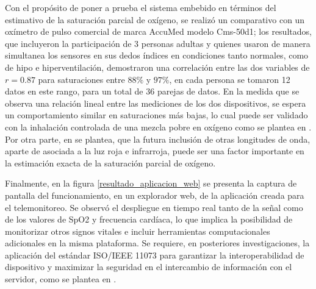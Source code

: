 \documentclass[journal]{IEEEtran}
\begin{document}
Con el propósito de poner a prueba el sistema embebido en términos del estimativo de la saturación parcial de oxígeno, se realizó un comparativo con un oxímetro de pulso comercial de marca AccuMed modelo Cms-50d1; {\color{green}los resultados, que incluyeron la participación de 3 personas adultas y quienes usaron de manera simultanea los sensores en sus dedos índices en condiciones tanto normales, como de hipo e hiperventilación, 
demostraron una correlación entre las dos variables de $r=0.87$ para saturaciones entre $88\%$ y $97\%$,
en cada persona se tomaron 12 datos en este rango, para un total de 36 parejas de datos.} 
En la medida que se observa una relación lineal entre las mediciones de los dos dispositivos, se espera un comportamiento similar en saturaciones más bajas, lo cual puede ser validado con la inhalación controlada de una mezcla pobre en oxígeno como se plantea en \cite{G_validacion_sensor_maxim}. {\color{green} Por otra parte, en \cite{G_revision_oximetro} se plantea, que la futura inclusión de otras longitudes de onda, aparte de asociada a la luz roja e infrarroja, puede ser una factor importante en la estimación exacta de la saturación parcial de oxígeno}.




Finalmente, en la figura \ref{resultado_aplicacion_web} se presenta la captura de pantalla del funcionamiento, en un explorador web, de la aplicación creada para el telemonitoreo. Se observó el despliegue en tiempo real tanto de la señal como de los valores de SpO2 y frecuencia cardíaca, lo que implica la posibilidad de monitorizar otros signos vitales e incluir herramientas computacionales adicionales en la misma plataforma. {\color{green}Se requiere, en posteriores investigaciones, la aplicación del estándar ISO/IEEE 11073 para garantizar la interoperabilidad de dispositivo y maximizar la seguridad en el intercambio de información con el servidor, como se plantea en \cite{G_remote_monitoring.pdf}.}
\end{document}
